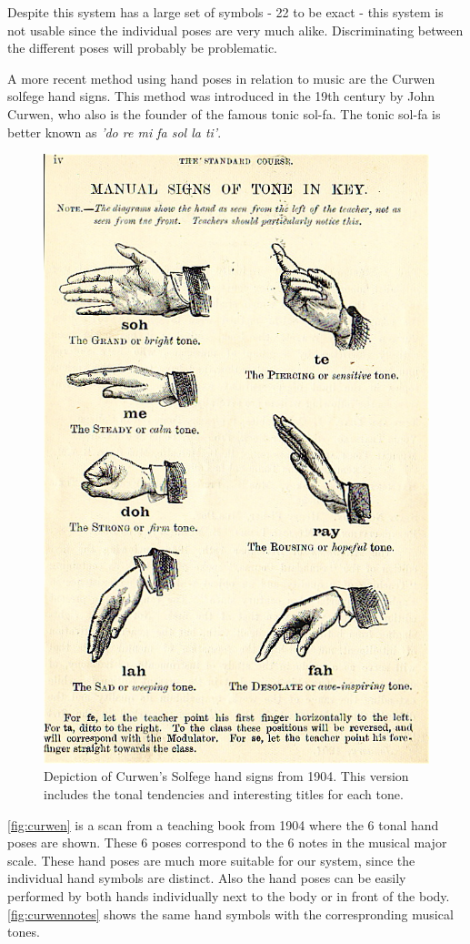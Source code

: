 Despite this system has a large set of symbols - 22 to be exact - this system is not usable since the individual poses are very much alike. Discriminating between the different poses will probably be problematic.

A more recent method using hand poses in relation to music are the Curwen solfege hand signs\cite{choksy1999}. This method was introduced in the 19th century by John Curwen, who also is the founder of the famous tonic sol-fa. The tonic sol-fa is better known as \emph{'do re mi fa sol la ti'}.

\begin{figure}[htbp]
	\centering{}
	\includegraphics[width=0.6\linewidth]{figures/curwen.jpg}
	\caption{Depiction of Curwen's Solfege hand signs from 1904. This version includes the tonal tendencies and interesting titles for each tone.}
	\label{fig:curwen}
\end{figure}

\autoref{fig:curwen} is a scan from a teaching book from 1904 where the 6 tonal hand poses are shown. These 6 poses correspond to the 6 notes in the musical major scale. These hand poses are much more suitable for our system, since the individual hand symbols are distinct. Also the hand poses can be easily performed by both hands individually next to the body or in front of the body. \autoref{fig:curwennotes} shows the same hand symbols with the correspronding musical tones.

